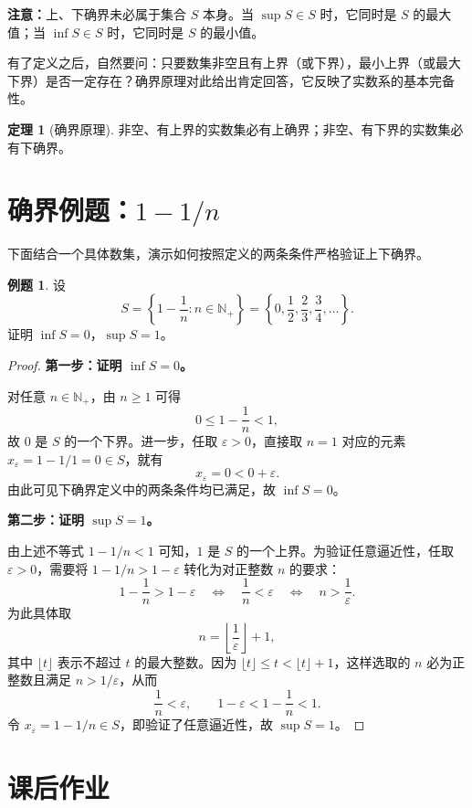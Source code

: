 \documentclass[UTF8, fontset=fandol, a4paper, 12pt]{ctexart}
\newcommand{\Nplus}{\mathbb{N}_{+}}
\theoremstyle{definition}
\newtheorem{theorem}[definition]{定理}
\newtheorem{example}[definition]{例题}
\begin{document}
\noindent\textbf{注意：}上、下确界未必属于集合 $S$ 本身。当 $\sup S\in S$ 时，它同时是 $S$ 的最大值；当 $\inf S\in S$ 时，它同时是 $S$ 的最小值。

有了定义之后，自然要问：只要数集非空且有上界（或下界），最小上界（或最大下界）是否一定存在？确界原理对此给出肯定回答，它反映了实数系的基本完备性。

\begin{theorem}[确界原理]
非空、有上界的实数集必有上确界；非空、有下界的实数集必有下确界。
\end{theorem}

\section{确界例题：\texorpdfstring{$1-1/n$}{1-1/n}}
下面结合一个具体数集，演示如何按照定义的两条条件严格验证上下确界。

\begin{example}
设
\[
  S=\left\{1-\frac1n:n\in\Nplus\right\}
   =\left\{0,\frac12,\frac23,\frac34,\ldots\right\}.
\]
证明 $\inf S=0$，$\sup S=1$。
\end{example}

\begin{proof}
\textbf{第一步：证明 $\inf S=0$。}

对任意 $n\in\Nplus$，由 $n\ge1$ 可得
\[
  0\le1-\frac1n<1,
\]
故 $0$ 是 $S$ 的一个下界。进一步，任取 $\varepsilon>0$，直接取 $n=1$ 对应的元素 $x_{\varepsilon}=1-1/1=0\in S$，就有
\[
  x_{\varepsilon}=0<0+\varepsilon.
\]
由此可见下确界定义中的两条条件均已满足，故 $\inf S=0$。

\medskip
\textbf{第二步：证明 $\sup S=1$。}

由上述不等式 $1-1/n<1$ 可知，$1$ 是 $S$ 的一个上界。为验证任意逼近性，任取 $\varepsilon>0$，需要将 $1-1/n>1-\varepsilon$ 转化为对正整数 $n$ 的要求：
\[
  1-\frac1n>1-\varepsilon
  \quad\Longleftrightarrow\quad
  \frac1n<\varepsilon
  \quad\Longleftrightarrow\quad
  n>\frac1\varepsilon.
\]
为此具体取
\[
  n=\left\lfloor\frac1\varepsilon\right\rfloor+1,
\]
其中 $\lfloor t\rfloor$ 表示不超过 $t$ 的最大整数。因为 $\lfloor t\rfloor\le t<\lfloor t\rfloor+1$，这样选取的 $n$ 必为正整数且满足 $n>1/\varepsilon$，从而
\[
  \frac1n<\varepsilon,
  \qquad 1-\varepsilon<1-\frac1n<1.
\]
令 $x_{\varepsilon}=1-1/n\in S$，即验证了任意逼近性，故 $\sup S=1$。
\end{proof}

\newpage
\section{课后作业}
\end{document}
